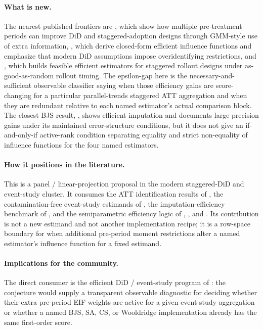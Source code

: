 \documentclass[11pt]{article}
\theoremstyle{definition}
\theoremstyle{plain}
\theoremstyle{remark}
\begin{document}
\paragraph{What is new.}
The nearest published frontiers are \citet{EgamiYamauchi2023}, which show how
multiple pre-treatment periods can improve DiD and staggered-adoption designs
through GMM-style use of extra information, \citet{ChenSantAnnaXie2025}, which
derive closed-form efficient influence functions and emphasize that modern DiD
assumptions impose overidentifying restrictions, and
\citet{RothSantAnna2023Efficient}, which builds feasible efficient estimators
for staggered rollout designs under as-good-as-random rollout timing.  The
epsilon-gap here is the necessary-and-sufficient observable classifier saying
when those efficiency gains are score-changing for a particular
parallel-trends staggered ATT aggregation and when they are redundant relative
to each named estimator's actual comparison block.  The closest BJS result,
\citet{BorusyakJaravelSpiess2024}, shows efficient imputation and documents
large precision gains under its maintained error-structure conditions, but it
does not give an if-and-only-if active-rank condition separating equality and
strict non-equality of influence functions for the four named estimators.

\paragraph{How it positions in the literature.}
This is a panel / linear-projection proposal in the modern staggered-DiD and
event-study cluster.  It consumes the ATT identification results of
\citet{CallawaySantAnna2021}, the contamination-free event-study estimands of
\citet{SunAbraham2021}, the imputation-efficiency benchmark of
\citet{BorusyakJaravelSpiess2024}, and the semiparametric efficiency logic of
\citet{SantAnnaZhao2020}, \citet{RothSantAnna2023Efficient}, and
\citet{ChenSantAnnaXie2025}.  Its contribution is not a new estimand and not
another implementation recipe; it is a row-space boundary for when additional
pre-period moment restrictions alter a named estimator's influence function
for a fixed estimand.

\paragraph{Implications for the community.}
The direct consumer is the efficient DiD / event-study program of
\citet{ChenSantAnnaXie2025}: the conjecture would supply a transparent
observable diagnostic for deciding whether their extra pre-period EIF weights
are active for a given event-study aggregation or whether a named BJS, SA, CS,
or Wooldridge implementation already has the same first-order score.
\end{document}
